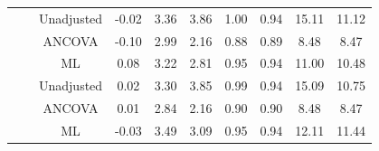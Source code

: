 \documentclass[12pt]{article}
\begin{document}
{\begin{table}[ht]
{\begin{tabular}{cccccccccc}
    \cmidrule(lr){2-10}
&   & Unadjusted & -0.02 & 3.36 & 3.86 & 1.00 & 0.94 & 15.11 & 11.12 \\ 
          & & ANCOVA & -0.10 & 2.99 & 2.16 & 0.88 & 0.89 & 8.48 & 8.47 \\  
          & & ML &  0.08 & 3.22 & 2.81 & 0.95 & 0.94 & 11.00 & 10.48 \\ 
    \cmidrule(lr){2-10}
&   & Unadjusted & 0.02 & 3.30 & 3.85 & 0.99 & 0.94 & 15.09 & 10.75 \\  
          & & ANCOVA &0.01 & 2.84 & 2.16 & 0.90 & 0.90 & 8.48 & 8.47 \\ 
          & & ML & -0.03 & 3.49 & 3.09 & 0.95 & 0.94 & 12.11 & 11.44 \\  
\hline
    \end{tabular}
    }
\end{table}

}
\end{document}
